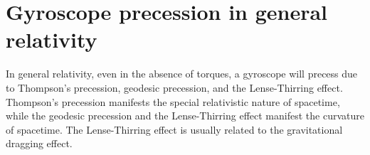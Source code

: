 \documentclass[12pt, ams, nofootinbib]{revtex4}
\begin{document}
\section{Gyroscope precession in general relativity}
In general relativity, even in the absence of torques, a gyroscope will precess due to Thompson's precession, geodesic precession, and the Lense-Thirring effect. Thompson's precession manifests the special relativistic nature of spacetime, while the geodesic precession and the Lense-Thirring effect manifest the curvature of spacetime. The Lense-Thirring effect is usually related to the gravitational dragging effect.




\end{document}
